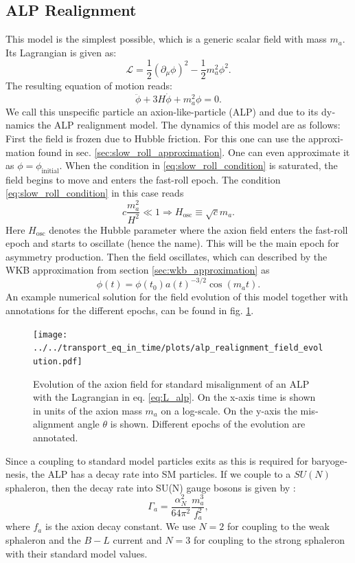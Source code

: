 \documentclass[master,       %
               twoside,        %
               BCOR10mm,       %
               english,ngerman, %
               ]{GAUBM}
\begin{document}
\begin{otherlanguage}{english}
\section{ALP Realignment}
This model is the simplest possible, which is a generic scalar field with mass $m_a$. Its Lagrangian is given as:
\begin{equation}
	\mathcal{L} = \frac{1}{2} \left( \partial_\mu \phi \right)^2 - \frac{1}{2} m_a^2 \phi^2.
	\label{eq:L_alp}
\end{equation}
The resulting equation of motion reads:
\begin{equation}
	\ddot{\phi} + 3 H \dot{\phi} + m_a^2 \phi = 0.
\end{equation}
We call this unspecific particle an axion-like-particle (ALP) and due to its dynamics the ALP realignment model.
The dynamics of this model are as follows:
First the field is frozen due to Hubble friction. For this one can use the approximation found in sec. \ref{sec:slow_roll_approximation}. One can even approximate it as $\phi = \phi_\mathrm{initial}$.
When the condition in \eqref{eq:slow_roll_condition} is saturated, the field begins to move and enters the fast-roll epoch. The condition \eqref{eq:slow_roll_condition} in this case reads
\begin{equation}
	c \frac{m_a^2}{H^2} \ll 1 \Rightarrow H_\mathrm{osc} \equiv \sqrt{c} m_a.
\end{equation}
Here $H_\mathrm{osc}$ denotes the Hubble parameter where the axion field enters the fast-roll epoch and starts to oscillate (hence the name).
This will be the main epoch for asymmetry production.
Then the field oscillates, which can described by the WKB approximation from section \ref{sec:wkb_approximation} as
\begin{equation}
	\phi(t) = \phi(t_0) a(t)^{-3/2} \cos(m_a t).
\end{equation}
An example numerical solution for the field evolution of this model together with annotations for the different epochs, can be found in fig. \ref{fig:alp_realignment_time_evolution}.
\begin{figure}[H]
	\label{fig:alp_realignment_time_evolution}
    \texttt{[image: ../../transport\_eq\_in\_time/plots/alp\_realignment\_field\_evolution.pdf]}
    \caption{Evolution of the axion field for standard misalignment of an ALP with the Lagrangian in eq. \eqref{eq:L_alp}. On the x-axis time is shown in units of the axion mass $m_a$ on a log-scale. On the y-axis the misalignment angle $\theta$ is shown. Different epochs of the evolution are annotated.}
\end{figure}
Since a coupling to standard model particles exits as this is required for baryogenesis, the ALP has a decay rate into SM particles. If we couple to a $SU(N)$ sphaleron, then the decay rate into SU(N) gauge bosons is given by \cite[eq. 15]{Kusenko_2015_Axion_Leptogenesis}:
\begin{equation}
	\Gamma_a = \frac{\alpha_N^2}{64\pi^2} \frac{m_a^3}{f_a^2},
\end{equation}
where $f_a$ is the axion decay constant.
We use $N = 2$ for coupling to the weak sphaleron and the $B-L$ current and $N = 3$ for coupling to the strong sphaleron with their standard model values.


\end{otherlanguage}
\end{document}
